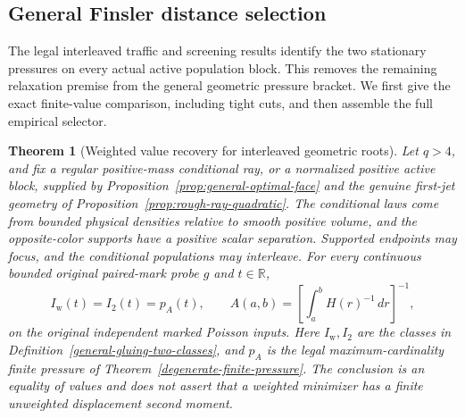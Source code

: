 \documentclass[11pt,reqno]{amsart}
\newtheorem{theorem}{Theorem}[section]
\theoremstyle{definition}
\theoremstyle{remark}
\numberwithin{equation}{section}
\newcommand{\R}{\mathbb R}
\begin{document}
\subsection{General Finsler distance selection}
\label{subsec:general-finsler-selector}

The legal interleaved traffic and screening results identify the two
stationary pressures on every actual active population block. This
removes the remaining relaxation premise from the general geometric
pressure bracket. We first give the exact finite-value comparison,
including tight cuts, and then assemble the full empirical selector.

\begin{theorem}[Weighted value recovery for interleaved geometric roots]
\label{thm:general-focal-value-equality}
Let \(q>4\), and fix a regular positive-mass conditional ray, or a
normalized positive active block, supplied by
Proposition~\ref{prop:general-optimal-face} and the genuine first-jet
geometry of Proposition~\ref{prop:rough-ray-quadratic}.
The conditional laws come from bounded physical densities relative
to smooth positive volume, and the opposite-color supports have a
positive scalar separation. Supported endpoints may focus, and the
conditional populations may interleave. For every continuous bounded
original paired-mark probe \(g\) and \(t\in\R\),
\begin{equation}
 I_{\mathrm w}(t)=I_2(t)=p_A(t),\qquad
 A(a,b)=\left[\int_a^b H(r)^{-1}\,dr\right]^{-1},
 \label{eq:interleaved-weighted-value-equality}
\end{equation}
on the original independent marked Poisson inputs.
Here \(I_{\mathrm w},I_2\) are the classes in
Definition~\ref{general-gluing-two-classes}, and \(p_A\) is the legal
maximum-cardinality finite pressure of
Theorem~\ref{degenerate-finite-pressure}.
The conclusion is an equality of values and does not assert that a
weighted minimizer has a finite unweighted displacement second moment.
\end{theorem}
\end{document}
